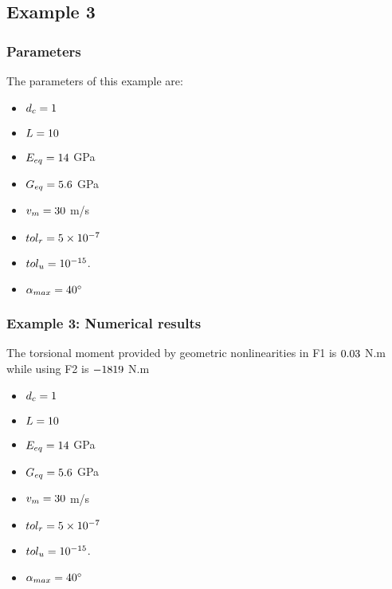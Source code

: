 \documentclass[3p,a4paper,11pt,review]{elsarticle}
\begin{document}
\clearpage 

\subsection{Example 3}



\subsubsection{Parameters}
The parameters of this example are:

\begin{itemize}
	\item $d_c= 1$ 
	\item $L = 10$
	\item $E_{eq} = 14$ GPa
	\item $G_{eq} = 5.6$ GPa
	\item $v_{m} = 30$ m/s
	\item $tol_r = 5\times 10^{-7}$
	\item $tol_u = 10^{-15}$.
	\item $\alpha_{max} = 40^{\circ}$
	
\end{itemize}


\subsubsection{Example 3: Numerical results}


The torsional moment provided by geometric nonlinearities in F1 is $0.03$ N.m while using F2 is $-1819$ N.m


\begin{itemize}
	\item $d_c= 1$ 
	\item $L = 10$
	\item $E_{eq} = 14$ GPa
	\item $G_{eq} = 5.6$ GPa
	\item $v_{m} = 30$ m/s
	\item $tol_r = 5\times 10^{-7}$
	\item $tol_u = 10^{-15}$.
	\item $\alpha_{max} = 40^{\circ}$
	
\end{itemize}
\end{document}
